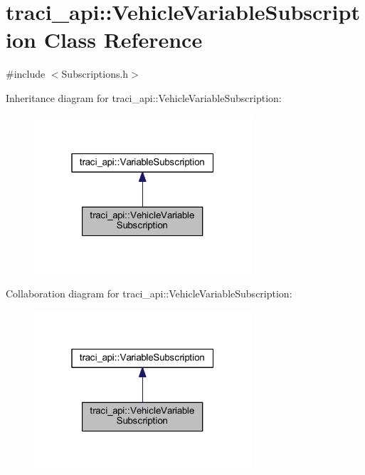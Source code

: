 \hypertarget{classtraci__api_1_1_vehicle_variable_subscription}{}\section{traci\+\_\+api\+:\+:Vehicle\+Variable\+Subscription Class Reference}
\label{classtraci__api_1_1_vehicle_variable_subscription}


{\ttfamily \#include $<$Subscriptions.\+h$>$}



Inheritance diagram for traci\+\_\+api\+:\+:Vehicle\+Variable\+Subscription\+:
\nopagebreak
\begin{figure}[H]
\begin{center}
\leavevmode
\includegraphics[width=229pt]{classtraci__api_1_1_vehicle_variable_subscription__inherit__graph}
\end{center}
\end{figure}


Collaboration diagram for traci\+\_\+api\+:\+:Vehicle\+Variable\+Subscription\+:
\nopagebreak
\begin{figure}[H]
\begin{center}
\leavevmode
\includegraphics[width=229pt]{classtraci__api_1_1_vehicle_variable_subscription__coll__graph}
\end{center}
\end{figure}
